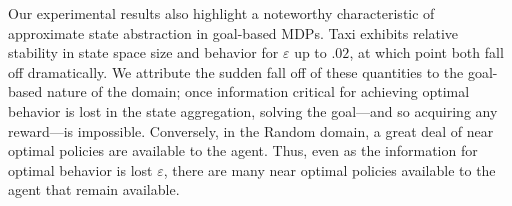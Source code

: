 Our experimental results also highlight a noteworthy characteristic of approximate state abstraction in goal-based \acp{MDP}. Taxi exhibits relative stability in state space size and behavior for $\varepsilon$ up to $.02$, at which point both fall off dramatically. We attribute the sudden fall off of these quantities to the goal-based nature of the domain; once information critical for achieving optimal behavior is lost in the state aggregation, solving the goal---and so acquiring any reward---is impossible. Conversely, in the Random domain, a great deal of near optimal policies are available to the agent. Thus, even as the information for optimal behavior is lost $\varepsilon$, there are many near optimal policies available to the agent that remain available. 


